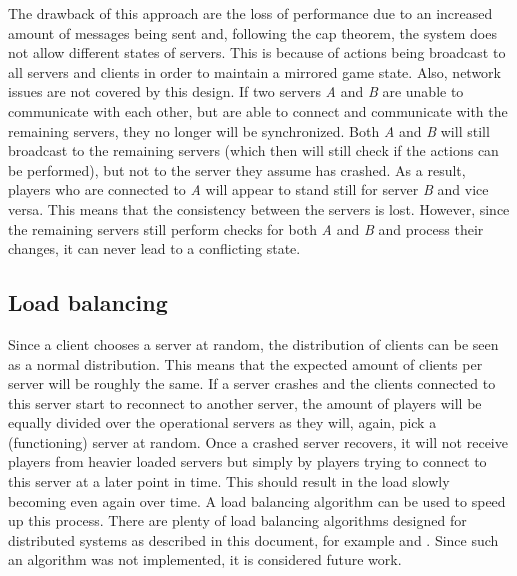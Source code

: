 		The drawback of this approach are the loss of performance due to an increased amount of messages being sent and, following the cap theorem, the system does not allow different states of servers. 
		This is because of actions being broadcast to all servers and clients in order to maintain a mirrored game state. 
		Also, network issues are not covered by this design. 
		If two servers \emph{A} and \emph{B} are unable to communicate with each other, but are able to connect and communicate with the remaining servers, they no longer will be synchronized. 
		Both \emph{A} and \emph{B} will still broadcast to the remaining servers (which then will still check if the actions can be performed), but not to the server they assume has crashed. 
		As a result, players who are connected to \emph{A} will appear to stand still for server \emph{B} and vice versa. 
		This means that the consistency between the servers is lost. 
		However, since the remaining servers still perform checks for both \emph{A} and \emph{B} and process their changes, it can never lead to a conflicting state.
	
	\subsection{Load balancing}
	\label{subsec:load_balancing}
		Since a client chooses a server at random, the distribution of clients can be seen as a normal distribution. 
		This means that the expected amount of clients per server will be roughly the same.
		If a server crashes and the clients connected to this server start to reconnect to another server, the amount of players will be equally divided over the operational servers as they will, again, pick a (functioning) server at random.
		Once a crashed server recovers, it will not receive players from heavier loaded servers but simply by players trying to connect to this server at a later point in time. 
		This should result in the load slowly becoming even again over time. 
		A load balancing algorithm can be used to speed up this process.
		There are plenty of load balancing algorithms designed for distributed systems as described in this document, for example \cite{wolff2001dynamic} and \cite{ballard2000client}. Since such an algorithm was not implemented, it is considered future work.
		
